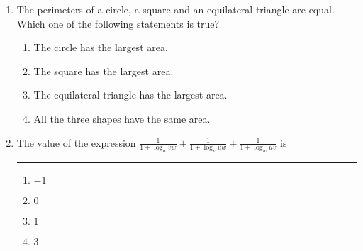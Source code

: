 \documentclass[journal,12pt,onecolumn]{IEEEtran}
\theoremstyle{remark}
\begin{document}
\begin{enumerate}
\begin{multicols}{4}
\begin{enumerate}
    \end{enumerate}
\end{multicols}
\item The perimeters of a circle, a square and an equilateral triangle are equal. Which one of the
following statements is true?
\begin{enumerate}
    \item The circle has the largest area.
\item  The square has the largest area.
\item  The equilateral triangle has the largest area.
\item  All the three shapes have the same area.
\end{enumerate}
\item The value of the expression $\frac{1}{1+\log_u{vw}}+\frac{1}{1+\log_v{uw}}+\frac{1}{1+\log_w{uv}}$ is \rule{3cm}{0.15mm}
\begin{multicols}{4}
    \begin{enumerate}
        \item $-1$
        \item $0$
        \item $1$
        \item $3$
    \end{enumerate}
\end{multicols}

\end{enumerate}
\end{document}
